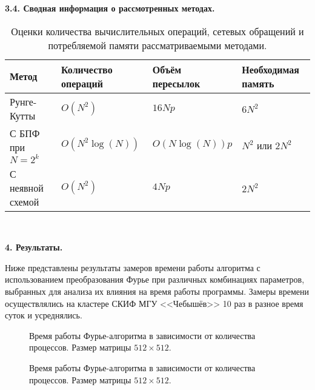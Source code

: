 \vspace{1em}
\textbf{3.4. Сводная информация о рассмотренных методах.} 
\vspace{0.5em}

\begin{table}[h!]\hspace{-1em}
\begin{tabular}{|l|l|l|l|}
    \hline
    Метод             & Количество операций & Объём пересылок & Необходимая память \\
    \hline
    Рунге-Кутты       & $O(N^2)$            & $16Np$          & $6 N^2$ \\
    \hline
    С БПФ при $N=2^k$ & $O(N^2\log(N))$     & $O(N\log(N))p$    & $N^2 \text{ или } 2 N^2$ \\
    \hline
    С неявной схемой  & $O(N^2)$            & $4Np$           & $2 N^2$ \\
    \hline
\end{tabular}
\\[1ex]
\caption{Оценки количества вычислительных операций, сетевых обращений и потребляемой памяти рассматриваемыми методами.}
\label{tab:MethodsSummary}
\end{table}

\newpage
\noindent \textbf{4. Результаты.}
\vspace{0.5em}

Ниже представлены результаты замеров времени работы алгоритма с использованием преобразования Фурье при различных комбинациях параметров,
выбранных для анализа их влияния на время работы программы.
Замеры времени осуществлялись на кластере СКИФ МГУ <<Чебышёв>> 10 раз в разное время суток и усреднялись.


    \begin{figure}[h!]
        \begin{center}
            \begin{minipage}{0.45\linewidth}
                \caption{Время работы Фурье-алгоритма в зависимости от количества процессов. Размер матрицы $512 \times 512$. }
                \label{gr:Fourier512Nomeasure}
            \end{minipage}
            \hfill
            \begin{minipage}{0.45\linewidth}
                \caption{Время работы Фурье-алгоритма в зависимости от количества процессов. Размер матрицы $512 \times 512$.}
                \label{gr:Fourier512Measure}
            \end{minipage}
        \end{center}
    \end{figure}

